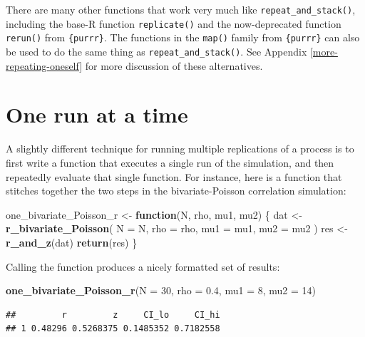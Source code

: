 \documentclass[
]{book}
\newenvironment{Shaded}{\begin{snugshade}}{\end{snugshade}}
\newcommand{\AttributeTok}[1]{\textcolor[rgb]{0.13,0.29,0.53}{#1}}
\newcommand{\ControlFlowTok}[1]{\textcolor[rgb]{0.13,0.29,0.53}{\textbf{#1}}}
\newcommand{\DecValTok}[1]{\textcolor[rgb]{0.00,0.00,0.81}{#1}}
\newcommand{\FloatTok}[1]{\textcolor[rgb]{0.00,0.00,0.81}{#1}}
\newcommand{\FunctionTok}[1]{\textcolor[rgb]{0.13,0.29,0.53}{\textbf{#1}}}
\newcommand{\NormalTok}[1]{#1}
\newcommand{\OtherTok}[1]{\textcolor[rgb]{0.56,0.35,0.01}{#1}}
\begin{document}
There are many other functions that work very much like \texttt{repeat\_and\_stack()}, including the base-R function \texttt{replicate()} and the now-deprecated function \texttt{rerun()} from \texttt{\{purrr\}}.
The functions in the \texttt{map()} family from \texttt{\{purrr\}} can also be used to do the same thing as \texttt{repeat\_and\_stack()}.
See Appendix \ref{more-repeating-oneself} for more discussion of these alternatives.

\section{One run at a time}\label{one-run-at-a-time}

A slightly different technique for running multiple replications of a process is to first write a function that executes a single run of the simulation, and then repeatedly evaluate that single function.
For instance, here is a function that stitches together the two steps in the bivariate-Poisson correlation simulation:

\begin{Shaded}
\begin{Highlighting}[]
\NormalTok{one\_bivariate\_Poisson\_r }\OtherTok{\textless{}{-}} \ControlFlowTok{function}\NormalTok{(N, rho, mu1, mu2) \{}
\NormalTok{  dat }\OtherTok{\textless{}{-}} \FunctionTok{r\_bivariate\_Poisson}\NormalTok{( }\AttributeTok{N =}\NormalTok{ N, }\AttributeTok{rho =}\NormalTok{ rho, }\AttributeTok{mu1 =}\NormalTok{ mu1, }\AttributeTok{mu2 =}\NormalTok{ mu2 )}
\NormalTok{  res }\OtherTok{\textless{}{-}} \FunctionTok{r\_and\_z}\NormalTok{(dat)}
  \FunctionTok{return}\NormalTok{(res)}
\NormalTok{\}}
\end{Highlighting}
\end{Shaded}

Calling the function produces a nicely formatted set of results:

\begin{Shaded}
\begin{Highlighting}[]
\FunctionTok{one\_bivariate\_Poisson\_r}\NormalTok{(}\AttributeTok{N =} \DecValTok{30}\NormalTok{, }\AttributeTok{rho =} \FloatTok{0.4}\NormalTok{, }\AttributeTok{mu1 =} \DecValTok{8}\NormalTok{, }\AttributeTok{mu2 =} \DecValTok{14}\NormalTok{)}
\end{Highlighting}
\end{Shaded}

\begin{verbatim}
##         r         z     CI_lo     CI_hi
## 1 0.48296 0.5268375 0.1485352 0.7182558
\end{verbatim}
\end{document}
